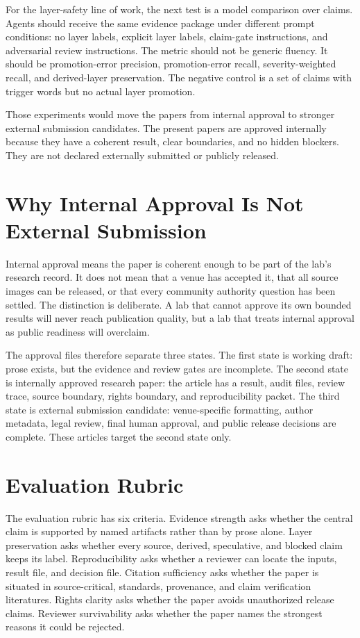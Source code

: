 \documentclass[sigconf,nonacm]{acmart}
\begin{document}
For the layer-safety line of work, the next test is a model comparison over
claims. Agents should receive the same evidence package under different prompt
conditions: no layer labels, explicit layer labels, claim-gate instructions, and
adversarial review instructions. The metric should not be generic fluency. It
should be promotion-error precision, promotion-error recall, severity-weighted
recall, and derived-layer preservation. The negative control is a set of claims
with trigger words but no actual layer promotion.

Those experiments would move the papers from internal approval to stronger
external submission candidates. The present papers are approved internally
because they have a coherent result, clear boundaries, and no hidden blockers.
They are not declared externally submitted or publicly released.

\section{Why Internal Approval Is Not External Submission}
Internal approval means the paper is coherent enough to be part of the lab's
research record. It does not mean that a venue has accepted it, that all source
images can be released, or that every community authority question has been
settled. The distinction is deliberate. A lab that cannot approve its own
bounded results will never reach publication quality, but a lab that treats
internal approval as public readiness will overclaim.

The approval files therefore separate three states. The first state is working
draft: prose exists, but the evidence and review gates are incomplete. The
second state is internally approved research paper: the article has a result,
audit files, review trace, source boundary, rights boundary, and reproducibility
packet. The third state is external submission candidate: venue-specific
formatting, author metadata, legal review, final human approval, and public
release decisions are complete. These articles target the second state only.

\section{Evaluation Rubric}
The evaluation rubric has six criteria. Evidence strength asks whether the
central claim is supported by named artifacts rather than by prose alone.
Layer preservation asks whether every source, derived, speculative, and blocked
claim keeps its label. Reproducibility asks whether a reviewer can locate the
inputs, result file, and decision file. Citation sufficiency asks whether the
paper is situated in source-critical, standards, provenance, and claim
verification literatures. Rights clarity asks whether the paper avoids
unauthorized release claims. Reviewer survivability asks whether the paper names
the strongest reasons it could be rejected.
\end{document}
